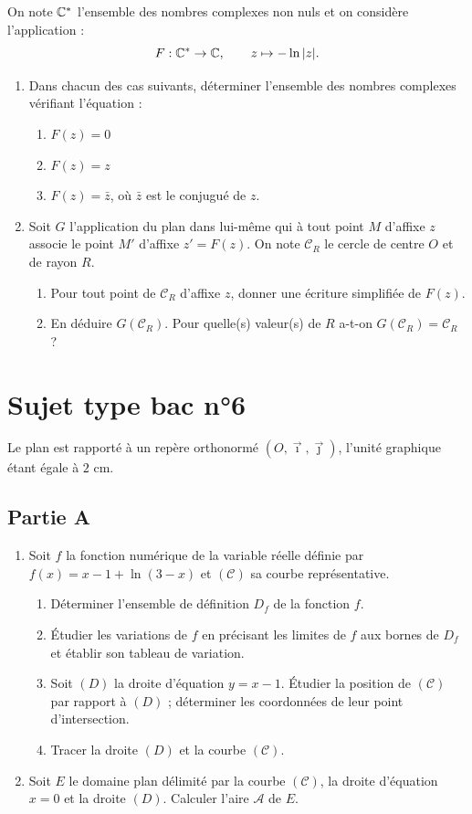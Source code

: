 On note $\mathbb{C}^*$ l'ensemble des nombres complexes non nuls et on considère l'application :
\[
F : \mathbb{C}^* \to \mathbb{C}, \qquad z \mapsto -\ln|z|.
\]

\begin{enumerate}
	\item Dans chacun des cas suivants, déterminer l'ensemble des nombres complexes vérifiant l'équation :
	\begin{enumerate}
		\item $F(z) = 0$
		\item $F(z) = z$
		\item $F(z) = \bar{z}$, où $\bar{z}$ est le conjugué de $z$.
	\end{enumerate}

	\item Soit $G$ l'application du plan dans lui-même qui à tout point $M$ d'affixe $z$ associe le point $M'$ d'affixe $z' = F(z)$. On note $\mathscr{C}_R$ le cercle de centre $O$ et de rayon $R$.
	\begin{enumerate}
		\item Pour tout point de $\mathscr{C}_R$ d'affixe $z$, donner une écriture simplifiée de $F(z)$.
		\item En déduire $G(\mathscr{C}_R)$. Pour quelle(s) valeur(s) de $R$ a-t-on $G(\mathscr{C}_R) = \mathscr{C}_R$ ?
	\end{enumerate}
\end{enumerate}


\section*{Sujet type bac n°6}

Le plan est rapporté à un repère orthonormé $(O,\vec{\imath},\vec{\jmath})$, l'unité graphique étant égale à $2$ cm.

\subsection*{Partie A}

\begin{enumerate}
	\item Soit $f$ la fonction numérique de la variable réelle définie par $f(x) = x - 1 + \ln(3-x)$ et $(\mathscr{C})$ sa courbe représentative.
	\begin{enumerate}
		\item Déterminer l'ensemble de définition $D_f$ de la fonction $f$.
		\item Étudier les variations de $f$ en précisant les limites de $f$ aux bornes de $D_f$ et établir son tableau de variation.
		\item Soit $(D)$ la droite d'équation $y = x-1$. Étudier la position de $(\mathscr{C})$ par rapport à $(D)$ ; déterminer les coordonnées de leur point d'intersection.
		\item Tracer la droite $(D)$ et la courbe $(\mathscr{C})$.
	\end{enumerate}
	\item Soit $E$ le domaine plan délimité par la courbe $(\mathscr{C})$, la droite d'équation $x = 0$ et la droite $(D)$. Calculer l'aire $\mathscr{A}$ de $E$.
\end{enumerate}

